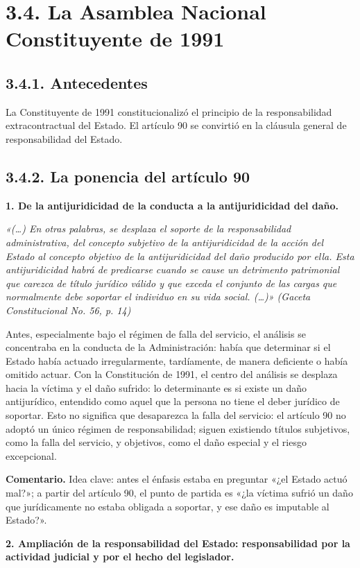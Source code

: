 \section{3.4. La Asamblea Nacional Constituyente de 1991}
\subsection{3.4.1. Antecedentes}
La Constituyente de 1991 constitucionalizó el principio de la responsabilidad extracontractual del Estado. El artículo 90 se convirtió en la cláusula general de responsabilidad del Estado.

\subsection{3.4.2. La ponencia del artículo 90}
\textbf{1. De la antijuridicidad de la conducta a la antijuridicidad del daño.}

\begin{cita}
\textit{«(…) En otras palabras, se desplaza el soporte de la responsabilidad administrativa, del concepto subjetivo de la antijuridicidad de la acción del Estado al concepto objetivo de la antijuridicidad del daño producido por ella. Esta antijuridicidad habrá de predicarse cuando se cause un detrimento patrimonial que carezca de título jurídico válido y que exceda el conjunto de las cargas que normalmente debe soportar el individuo en su vida social. (…)» (Gaceta Constitucional No. 56, p. 14)}
\end{cita}
Antes, especialmente bajo el régimen de falla del servicio, el análisis se concentraba en la conducta de la Administración: había que determinar si el Estado había actuado irregularmente, tardíamente, de manera deficiente o había omitido actuar. Con la Constitución de 1991, el centro del análisis se desplaza hacia la víctima y el daño sufrido: lo determinante es si existe un daño antijurídico, entendido como aquel que la persona no tiene el deber jurídico de soportar. Esto no significa que desaparezca la falla del servicio: el artículo 90 no adoptó un único régimen de responsabilidad; siguen existiendo títulos subjetivos, como la falla del servicio, y objetivos, como el daño especial y el riesgo excepcional.

\begin{comentario}
\textcolor[HTML]{8A6D3B}{\textbf{Comentario. }}Idea clave: antes el énfasis estaba en preguntar «¿el Estado actuó mal?»; a partir del artículo 90, el punto de partida es «¿la víctima sufrió un daño que jurídicamente no estaba obligada a soportar, y ese daño es imputable al Estado?».
\end{comentario}
\textbf{2. Ampliación de la responsabilidad del Estado: responsabilidad por la actividad judicial y por el hecho del legislador.}

